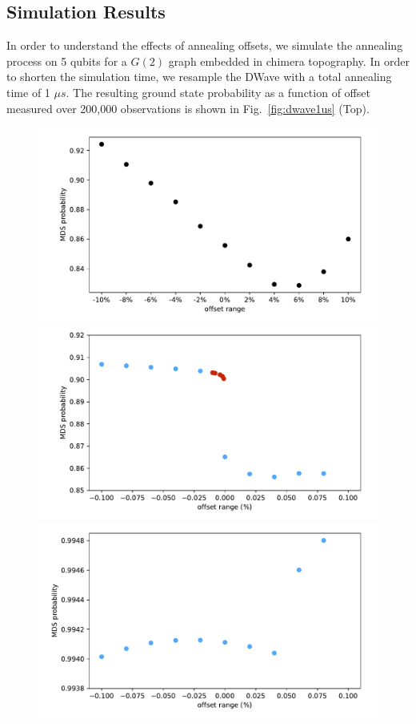\documentclass[prd,twocolumn,tightenlines,preprintnumbers,showpacs,superscriptaddress,notitlepage,nofootinbib,eqsecnum,floatfix,longbibliography]{revtex4}
\begin{document}
\subsection{Simulation Results}

In order to understand the effects of annealing offsets, we simulate the annealing process on 5 qubits for a $G(2)$ graph embedded in chimera topography.
In order to shorten the simulation time, we resample the DWave with a total annealing time of 1 $\mu s$.
The resulting ground state probability as a function of offset measured over 200,000 observations is shown in Fig.~\ref{fig:dwave1us} (Top).

\begin{figure}
    \centering
    \includegraphics[width=\columnwidth]{./figures/dwave1us.pdf}
    \includegraphics[width=\columnwidth]{./figures/sim_deco.pdf}
    \includegraphics[width=\columnwidth]{./figures/sim_nodeco.pdf}

\end{figure}
\end{document}

